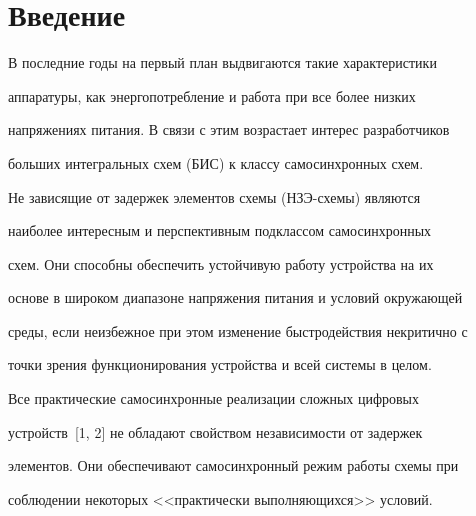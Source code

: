 









 \thispagestyle{empty}


 







   \section{Введение}





   В последние годы на первый план выдвигаются такие характеристики


аппаратуры, как энергопотребление и работа при все более низких


напряжениях питания. В связи с этим возрастает интерес разработчиков


больших интегральных схем (БИС) к классу самосинхронных схем.


Не зависящие от задержек элементов схемы (НЗЭ-схе\-мы) являются


наиболее интересным и перспективным подклассом самосинхронных


схем. Они способны обеспечить устойчивую работу устройства на их


основе в широком диапазоне напряжения питания и условий окружающей


среды, если неизбежное при этом изменение быстродействия некритично с


точки зрения функционирования устройства и всей системы в целом.





   Все практические самосинхронные реализации сложных циф\-ро\-вых


устройств~[1, 2] не обладают свойством независимости от задержек


элементов. Они обеспечивают самосинхронный режим работы схемы при


соблюдении некоторых <<практически выполняющихся>> условий.


